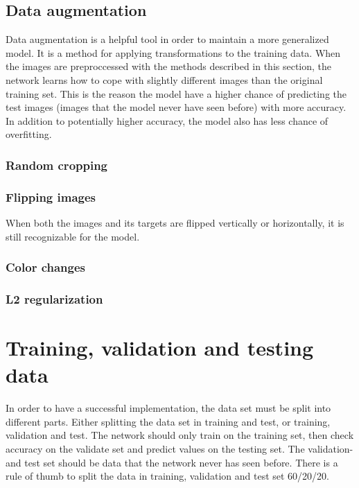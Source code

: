 \documentclass[USenglish]{ifimaster}  %
\begin{document}
\subsection{Data augmentation}
Data augmentation is a helpful tool in order to maintain a more generalized model. It is a method for applying transformations to the training data. When the images are preproccessed with the methods described in this section, the network learns how to cope with slightly different images than the original training set. This is the reason the model have a higher chance of predicting the test images (images that the model never have seen before) with more accuracy. In addition to potentially higher accuracy, the model also has less chance of overfitting.  
\subsubsection{Random cropping}
\subsubsection{Flipping images}
When both the images and its targets are flipped vertically or horizontally, it is still recognizable for the model.  
\subsubsection{Color changes}
\subsubsection{L2 regularization}
\section{Training, validation and testing data}
In order to have a successful implementation, the data set must be split into different parts. Either splitting the data set in training and test, or training, validation and test. The network should only train on the training set, then check accuracy on the validate set and predict values on the testing set. The validation- and test set should be data that the network never has seen before. There is a rule of thumb to split the data in training, validation and test set 60/20/20.  
\end{document}
